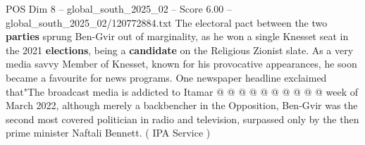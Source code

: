 \begin{textsample}{POS Dim 8 – global\_south\_2025\_02 – Score 6.00 – global\_south\_2025\_02/120772884.txt}
The electoral pact between the two \textbf{parties} sprung Ben-Gvir out of marginality, as he won a single Knesset seat in the 2021 \textbf{elections}, being a \textbf{candidate} on the Religious Zionist slate.
As a very media savvy Member of Knesset, known for his provocative appearances, he soon became a favourite for news programs.
One newspaper headline exclaimed that"The broadcast media is addicted to Itamar @ @ @ @ @ @ @ @ @ @ week of March 2022, although merely a backbencher in the Opposition, Ben-Gvir was the second most covered politician in radio and television, surpassed only by the then prime minister Naftali Bennett. ( IPA Service )

\end{textsample}
